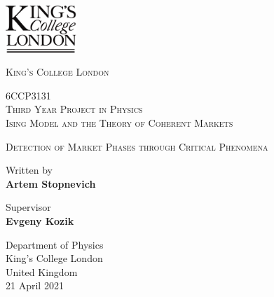 \begin{titlepage}
   \begin{center}
   	\vspace*{2cm}
       	\includegraphics[width=0.2\textwidth]{figures/KCL_2.png}
       
	\LARGE{\textsc{King's College London}}
	
	\vspace{1.5cm}
	
	\HRule{0.5pt} 
	
	\large{\textsc{6CCP3131}\\
	\vspace{0.2cm}
	\textsc{Third Year Project in Physics}}\\
	\vspace{0.2cm}
	\LARGE{\textsc{Ising Model and the Theory of Coherent Markets}}
	
	\HRule{2pt} 
	\vspace{0.5cm}
	\large{\textsc{Detection of Market Phases through Critical Phenomena}}

 
            
       	\vspace{1.5cm}
	\small{Written by}\\
      	\large{\textbf{Artem Stopnevich}}
	
	
      
       	\vfill
        
	\small{Supervisor}\\
      	\large{\textbf{Evgeny Kozik}}

       	\vspace{0.8cm}
     

            
       	\normalsize{Department of Physics\\
       	King's College London\\
       	United Kingdom\\
       	21 April 2021}
            
   \end{center}
\end{titlepage}